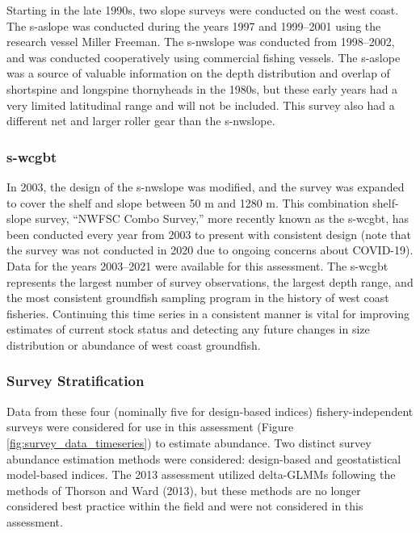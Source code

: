 \documentclass[11pt,
  english,
  letterpaper,
]{article}
\begin{document}
Starting in the late 1990s, two slope surveys were conducted on the west coast. The \gls{s-aslope} was conducted during the years 1997 and 1999--2001 using the research vessel Miller Freeman. The \gls{s-nwslope} was conducted from 1998--2002, and was conducted cooperatively using commercial fishing vessels. The \gls{s-aslope} was a source of valuable information on the depth distribution and overlap of shortspine and longspine thornyheads in the 1980s, but these early years had a very limited latitudinal range and will not be included. This survey also had a different net and larger roller gear than the \gls{s-nwslope}.

\hypertarget{section-1}{%
\subsubsection{\texorpdfstring{\acrlong{s-wcgbt}}{}}\label{section-1}}

In 2003, the design of the \gls{s-nwslope} was modified, and the survey was expanded to cover the shelf and slope between 50 m and 1280 m. This combination shelf-slope survey, ``NWFSC Combo Survey,'' more recently known as the \gls{s-wcgbt}, has been conducted every year from 2003 to present with consistent design (note that the survey was not conducted in 2020 due to ongoing concerns about COVID-19). Data for the years 2003--2021 were available for this assessment. The \gls{s-wcgbt} represents the largest number of survey observations, the largest depth range, and the most consistent groundfish sampling program in the history of west coast fisheries. Continuing this time series in a consistent manner is vital for improving estimates of current stock status and detecting any future changes in size distribution or abundance of west coast groundfish.

\hypertarget{survey-stratification}{%
\subsubsection{Survey Stratification}\label{survey-stratification}}

Data from these four (nominally five for design-based indices) fishery-independent surveys were considered for use in this assessment (Figure \ref{fig:survey_data_timeseries}) to estimate abundance. Two distinct survey abundance estimation methods were considered: design-based and geostatistical model-based indices. The 2013 assessment utilized delta-GLMMs following the methods of Thorson and Ward (2013), but these methods are no longer considered best practice within the field and were not considered in this assessment.
\end{document}
